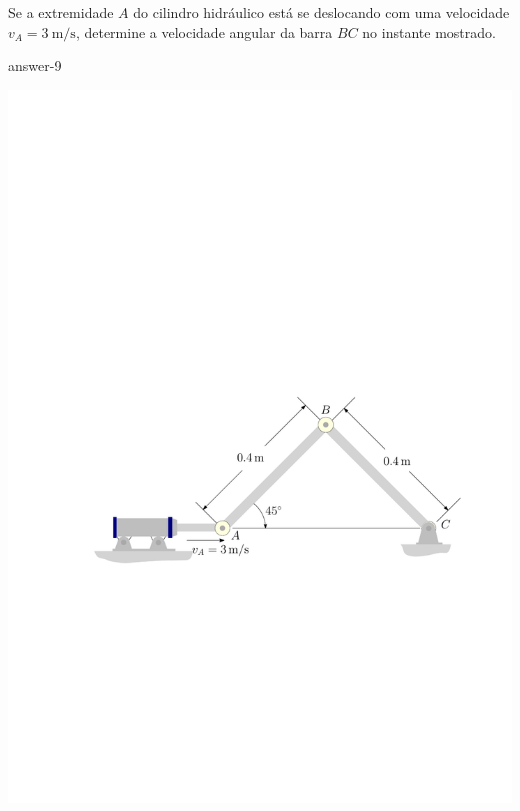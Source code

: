 \item Se a extremidade $A$ do cilindro hidráulico está se deslocando com uma velocidade $v_{A}=\SI{3}{\meter/\second}$,
determine a velocidade angular da barra $BC$ no instante mostrado.

{answer-9}

\vspace{-1.45cm}
\begin{flushright}
	\includegraphics[scale=.9]{images/draw_6}
\end{flushright}